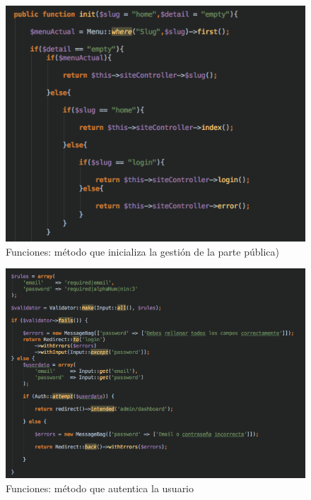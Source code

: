 \begin{figure}
\begin{center}
\includegraphics[width=1.0\textwidth]{imagenes/controller-init.png}
\caption{Funciones: método que inicializa la gestión de la parte pública)}
\label{controller-init}
\end{center}
\end{figure}


\begin{figure}
\begin{center}
\includegraphics[width=1.0\textwidth]{imagenes/controller-login.png}
\caption{Funciones: método que autentica la usuario}
\label{controller-login}
\end{center}
\end{figure}

